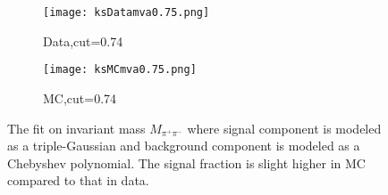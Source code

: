 
\begin{figure}[htpb]
	\begin{subfigure}{0.5\linewidth}
		\caption{Data,cut=0.74}
		\texttt{[image: ksDatamva0.75.png]}
	\end{subfigure}
\begin{subfigure}{0.5\linewidth}
	\caption{MC,cut=0.74}
	\texttt{[image: ksMCmva0.75.png]}
\end{subfigure}
\caption{The fit on invariant mass $M_{\pi^+\pi^-}$ where signal component is modeled as a triple-Gaussian and background component is modeled as a Chebyshev polynomial. The signal fraction is slight higher in MC compared to that in data.}
\label{fig:Rfit}
\end{figure}

\begin{comment}
\begin{subfigure}{0.5\linewidth}
\caption{Data,cut=0.9}
\texttt{[image: ksDatamva0.9.png]}
\end{subfigure}
\begin{subfigure}{0.5\linewidth}
\caption{MC,cut=0.9}
\texttt{[image: ksMCmva0.9.png]}
\end{subfigure}
\caption{Invariant mass fit of $K_S^0$ using cut at 0.2(loose) and 0.9(tight) to calculate $S_{data/MC}$.}
\end{figure}
\end{comment}

\begin{comment}
\subsection{Summary}
The development of Belle II $K_S^0$ classifier is enlighten by the experience from Belle. A comprehensive study of training observables from $K_S^0$ decay characteristics has been exploited. It takes the advantage of FastBDT algorithm to achieve a high fake rejection power. As a result, classifier is able to give a output which can be used as a cut to select good $K_S^0$ candidates with high purity. The classifier is validated with real experimental data as well. A primary data validation study of KsFinder is conducted with implementing correction on data and MC along with its contribution to $B^0$. The performance of KsFinder is in a good shape and no clear bias is found on the yield of the number of $K_S^0$. For the reconstruction of $B^0 \to K_S^0  K_S^0  K_S^0$, the development of KsFinder is critical to suppress large fraction of combination background from fake $K_S^0$.
\end{comment}
